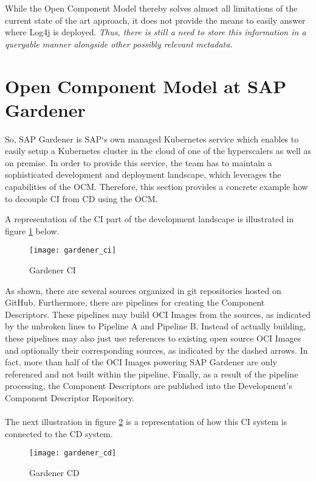 While the Open Component Model thereby solves almost all limitations of the current state of the art approach, it does not provide the means to easily answer where Log4j is deployed. \emph{Thus, there is still a need to store this information in a queryable manner alongside other possibly relevant metadata.}

\section{Open Component Model at SAP Gardener} \label{sec:Development and Deployment Landscape at SAP Gardener}
So, SAP Gardener is SAP`s own managed Kubernetes service which enables to easily setup a Kubernetes cluster in the cloud of one of the hyperscalers as well as on premise. In order to provide this service, the team has to maintain a sophisticated development and deployment landscape, which leverages the capabilities of the OCM. Therefore, this section provides a concrete example how to decouple CI from CD using the OCM.\par
A representation of the CI part of the development landscape is illustrated in figure \ref{fig:GardenerCI} below.

\begin{figure}[H]
	\centering
	\texttt{[image: gardener\_ci]}
	\caption[Gardener CI]{Gardener CI }
	\label{fig:GardenerCI}
\end{figure}

As shown, there are several sources organized in git repositories hosted on GitHub. Furthermore, there are pipelines for creating the Component Descriptors. These pipelines may build OCI Images from the sources, as indicated by the unbroken lines to Pipeline A and Pipeline B. Instead of actually building, these pipelines may also just use references to existing open source OCI Images and optionally their corresponding sources, as indicated by the dashed arrows. In fact, more than half of the OCI Images powering SAP Gardener are only referenced and not built within the pipeline. Finally, as a result of the pipeline processing, the Component Descriptors are published into the Development's Component Descriptor Repository.\\\\
The next illustration in figure \ref{fig:GardenerCD} is a representation of how this CI system is connected to the CD system.

\begin{figure}[H]
	\centering
	\texttt{[image: gardener\_cd]}
	\caption[Gardener CD]{Gardener CD }
	\label{fig:GardenerCD}
\end{figure}
 
